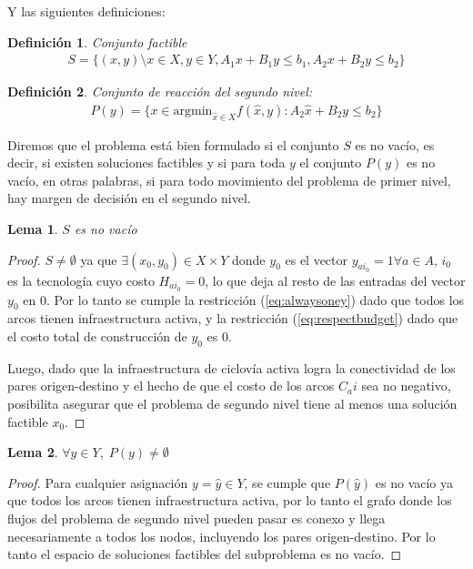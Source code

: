 \documentclass{article}
\newtheorem{definition}{Definición}
\newtheorem{lemma}{Lema}
\begin{document}
  Y las siguientes definiciones:

  \begin{definition}
    Conjunto factible
    \begin{align}
      S = \{(x, y) \setminus x \in X, y \in Y, A_1 x + B_1 y \leq b_1, A_2 x + B_2 y \leq b_2 \}
    \end{align}
  \end{definition}

  \begin{definition}
    Conjunto de reacción del segundo nivel:
    \begin{align}
      P(y) = \{ x \in \text{argmin}_{\hat{x} \in X} f(\hat{x}, y) : A_2 \hat{x} + B_2 y \leq b_2 \}
    \end{align}
  \end{definition}

  Diremos que el problema está bien formulado si el conjunto $S$ es no vacío, es decir, si existen soluciones factibles y si para toda $y$ el conjunto $P(y)$ es no vacío, en otras palabras, si para todo movimiento del problema de primer nivel, hay margen de decisión en el segundo nivel.

  \begin{lemma}$S$ es no vacío
  \end{lemma}

  \begin{proof}
    $S \neq \emptyset$ ya que $\exists (x_0, y_0) \in X \times Y$ donde $y_0$ es el vector $y_{ai_0} = 1 \forall a \in A$, $i_0$ es la tecnología cuyo costo $H_{ai_0} = 0$, lo que deja al resto de las entradas del vector $y_0$ en $0$. Por lo tanto se cumple la restricción (\ref{eq:alwaysoney}) dado que todos los arcos tienen infraestructura activa, y la restricción (\ref{eq:respectbudget}) dado que el costo total de construcción de $y_0$ es $0$.

    Luego, dado que la infraestructura de ciclovía activa logra la conectividad de los pares origen-destino y el hecho de que el costo de los arcos $C_ai$ sea no negativo, posibilita asegurar que el problema de segundo nivel tiene al menos una solución factible $x_0$.
  \end{proof}

  \begin{lemma}$\forall y \in Y,\; P(y) \neq \emptyset$
  \end{lemma}

  \begin{proof}
    Para cualquier asignación $y = \hat{y} \in Y$, se cumple que $P(\hat{y})$ es no vacío ya que todos los arcos tienen infraestructura activa, por lo tanto el grafo donde los flujos del problema de segundo nivel pueden pasar es conexo y llega necesariamente a todos los nodos, incluyendo los pares origen-destino. Por lo tanto el espacio de soluciones factibles del subproblema es no vacío. 
  \end{proof}
\end{document}
